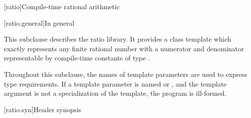 [ratio]{Compile-time rational arithmetic}

[ratio.general]{In general}

\pnum
{}%
This subclause describes the ratio library. It provides a class template
 which exactly represents any finite rational number with a
numerator and denominator representable by compile-time constants of type
.

\pnum
Throughout this subclause, the names of template parameters are used to express
type requirements. If a template parameter is named  or ,
and the template argument is not a specialization of the  template,
the program is ill-formed.

[ratio.syn]{Header  synopsis}

